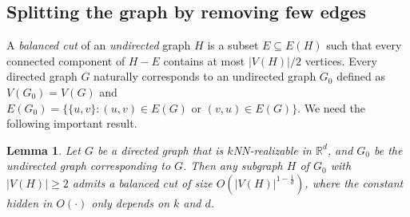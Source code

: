 \documentclass[11pt]{article}
\newtheorem{lemma}{Lemma}
\begin{document}
\subsection{Splitting the graph by removing few edges} \label{sec-split}

A \textit{balanced cut} of an \textit{undirected} graph $H$ is a subset $E \subseteq E(H)$ such that every connected component of $H- E$ contains at most $|V(H)|/2$ vertices.
Every directed graph $G$ naturally corresponds to an undirected graph $G_0$ defined as $V(G_0) = V(G)$ and $E(G_0) = \{\{u,v\}: (u,v) \in E(G) \text{ or } (v,u) \in E(G)\}$.
We need the following important result.
\begin{lemma} \label{lem-smallcut}
Let $G$ be a directed graph that is $k$NN-realizable in $\mathbb{R}^d$, and $G_0$ be the undirected graph corresponding to $G$.
Then any subgraph $H$ of $G_0$ with $|V(H)| \geq 2$ admits a balanced cut of size $O(|V(H)|^{1-\frac{1}{d}})$, where the constant hidden in $O(\cdot)$ only depends on $k$ and $d$.
\end{lemma}
\end{document}
